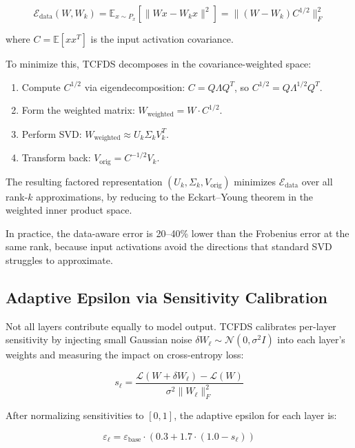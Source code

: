 \documentclass[11pt,a4paper]{article}
\begin{document}
\begin{equation}
    \mathcal{E}_{\mathrm{data}}(W, W_k) = \mathbb{E}_{x \sim P_x}\!\left[\|Wx - W_k x\|^2\right] = \|(W - W_k) C^{1/2}\|_F^2
\end{equation}

where $C = \mathbb{E}[xx^T]$ is the input activation covariance.

To minimize this, TCFDS decomposes in the covariance-weighted space:

\begin{enumerate}
    \item Compute $C^{1/2}$ via eigendecomposition: $C = Q\Lambda Q^T$, so $C^{1/2} = Q\Lambda^{1/2}Q^T$.
    \item Form the weighted matrix: $W_{\mathrm{weighted}} = W \cdot C^{1/2}$.
    \item Perform SVD: $W_{\mathrm{weighted}} \approx U_k \Sigma_k V_k^T$.
    \item Transform back: $V_{\mathrm{orig}} = C^{-1/2} V_k$.
\end{enumerate}

The resulting factored representation $(U_k, \Sigma_k, V_{\mathrm{orig}})$ minimizes $\mathcal{E}_{\mathrm{data}}$ over all rank-$k$ approximations, by reducing to the Eckart--Young theorem in the weighted inner product space.

In practice, the data-aware error is 20--40\% lower than the Frobenius error at the same rank, because input activations avoid the directions that standard SVD struggles to approximate.

\subsection{Adaptive Epsilon via Sensitivity Calibration}

Not all layers contribute equally to model output. TCFDS calibrates per-layer sensitivity by injecting small Gaussian noise $\delta W_\ell \sim \mathcal{N}(0, \sigma^2 I)$ into each layer's weights and measuring the impact on cross-entropy loss:

\begin{equation}
    s_\ell = \frac{\mathcal{L}(W + \delta W_\ell) - \mathcal{L}(W)}{\sigma^2 \|W_\ell\|_F^2}
\end{equation}

After normalizing sensitivities to $[0, 1]$, the adaptive epsilon for each layer is:

\begin{equation}
    \varepsilon_\ell = \varepsilon_{\mathrm{base}} \cdot (0.3 + 1.7 \cdot (1.0 - s_\ell))
\end{equation}
\end{document}
